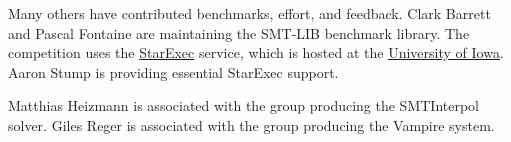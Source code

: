 \documentclass[12pt]{article}
\begin{document}
Many others have contributed benchmarks, effort, and feedback.  Clark
Barrett and Pascal Fontaine are maintaining the SMT-LIB benchmark
library.  The competition uses the
\href{https://www.starexec.org/}{StarExec} service, which is hosted at
the \href{http://www.cs.uiowa.edu/}{University of Iowa}.  Aaron Stump
is providing essential StarExec support.

%
Matthias Heizmann is associated with the group producing the
SMTInterpol solver.  Giles Reger is associated with the group
producing the Vampire system.





\end{document}
